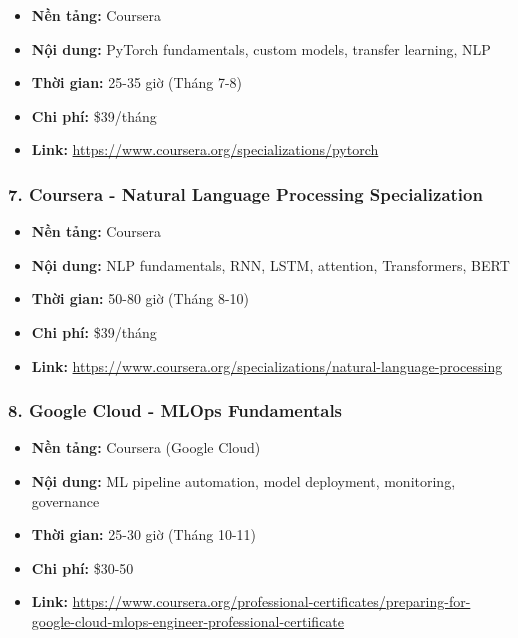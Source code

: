 \documentclass[12pt,a4paper]{article}
\begin{document}
\begin{itemize}
    \item \textbf{Nền tảng:} Coursera
    \item \textbf{Nội dung:} PyTorch fundamentals, custom models, transfer learning, NLP
    \item \textbf{Thời gian:} 25-35 giờ (Tháng 7-8)
    \item \textbf{Chi phí:} \$39/tháng
    \item \textbf{Link:} \url{https://www.coursera.org/specializations/pytorch}
\end{itemize}

\subsubsection{7. Coursera - Natural Language Processing Specialization}

\begin{itemize}
    \item \textbf{Nền tảng:} Coursera
    \item \textbf{Nội dung:} NLP fundamentals, RNN, LSTM, attention, Transformers, BERT
    \item \textbf{Thời gian:} 50-80 giờ (Tháng 8-10)
    \item \textbf{Chi phí:} \$39/tháng
    \item \textbf{Link:} \url{https://www.coursera.org/specializations/natural-language-processing}
\end{itemize}

\subsubsection{8. Google Cloud - MLOps Fundamentals}

\begin{itemize}
    \item \textbf{Nền tảng:} Coursera (Google Cloud)
    \item \textbf{Nội dung:} ML pipeline automation, model deployment, monitoring, governance
    \item \textbf{Thời gian:} 25-30 giờ (Tháng 10-11)
    \item \textbf{Chi phí:} \$30-50
    \item \textbf{Link:} \url{https://www.coursera.org/professional-certificates/preparing-for-google-cloud-mlops-engineer-professional-certificate}
\end{itemize}

\newpage
\end{document}
